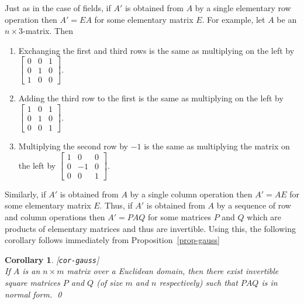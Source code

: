 \documentclass{amsart}
\newcommand{\lbl}[1]{\label{#1}\textup{[\texttt{#1}]}\ \\}
\newcommand{\lbl}{\label}
\newcommand{\bsm}       {\left[\begin{smallmatrix}}
\newcommand{\esm}       {\end{smallmatrix}\right]}
\newcommand{\tm}        {\times}
\renewcommand{\:}{\colon}
\newtheorem{corollary}[theorem]{Corollary}
\theoremstyle{definition}
\begin{document}
Just as in the case of fields, if $A'$ is obtained from $A$ by a
single elementary row operation then $A'=EA$ for some elementary
matrix $E$.  For example, let $A$ be an $n\tm 3$-matrix.  Then 
\begin{enumerate}
\item Exchanging the first and third rows is the same as multiplying on
 the left by $\bsm 0&0&1\\0&1&0\\1&0&0\esm$.
\item Adding the third row to the first is the same as multiplying on
 the left by $\bsm 1&0&1\\0&1&0\\0&0&1\esm$.
\item Multiplying the second row by $-1$ is the same as multiplying
 the matrix on the left by $\bsm 1&0&0\\0&-1&0\\0&0&1\esm$.
\end{enumerate}
Similarly, if $A'$ is obtained from $A$ by a single column operation
then $A'=AE$ for some elementary matrix $E$.  Thus, if $A'$ is
obtained from $A$ by a sequence of row and column operations then
$A'=PAQ$ for some matrices $P$ and $Q$ which are products of
elementary matrices and thus are invertible.  Using this, the
following corollary follows immediately from
Proposition~\ref{prop-gauss}
\begin{corollary}\lbl{cor-gauss}
 If $A$ is an $n\tm m$ matrix over a Euclidean domain, then there
 exist invertible square matrices $P$ and $Q$ (of size $m$ and $n$
 respectively) such that $PAQ$ is in normal form. \qed
\end{corollary}
\end{document}
